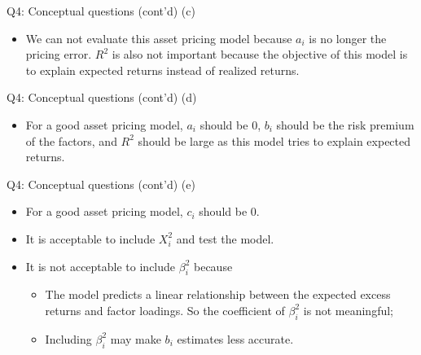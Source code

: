 \documentclass[10pt,t]{beamer}
\begin{document}
\begin{frame}{Q4: Conceptual questions (cont'd)}
(c)
\begin{itemize}
	\item We can not evaluate this asset pricing model because $a_i$ is no longer the pricing error. $R^2$ is also not important because the objective of this model is to explain expected returns instead of realized returns.
\end{itemize}
\end{frame}

\begin{frame}{Q4: Conceptual questions (cont'd)}
(d)
\begin{itemize}
	\item For a good asset pricing model, $a_i$ should be $0$, $b_i$ should be the risk premium of the factors, and $R^2$ should be large as this model tries to explain expected returns.
\end{itemize}
\end{frame}

\begin{frame}{Q4: Conceptual questions (cont'd)}
(e)
\begin{itemize}
	\item For a good asset pricing model, $c_i$ should be $0$.
	\item It is acceptable to include $X_i^2$ and test the model.
	\item It is not acceptable to include $\beta_i^2$ because
	\begin{itemize}
		\item The model predicts a linear relationship between the expected excess returns and factor loadings. So the coefficient of $\beta_i^2$ is not meaningful;
		\item Including $\beta_i^2$ may make $b_i$ estimates less accurate.
	\end{itemize}
\end{itemize}
\end{frame}
\end{document}
